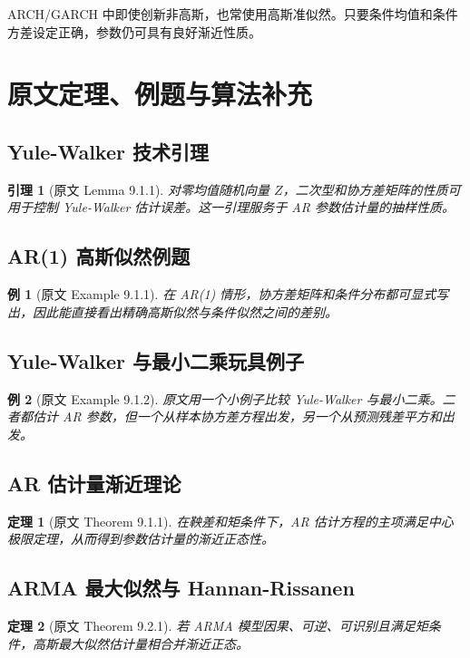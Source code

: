 \documentclass[11pt,a4paper]{ctexart}
\newtheorem{theorem}{定理}[section]
\newtheorem{lemma}{引理}[section]
\newtheorem{example}{例}[section]
\begin{document}
ARCH/GARCH 中即使创新非高斯，也常使用高斯准似然。只要条件均值和条件方差设定正确，参数仍可具有良好渐近性质。

\section{原文定理、例题与算法补充}

\subsection{Yule-Walker 技术引理}
\begin{lemma}[原文 Lemma 9.1.1]
对零均值随机向量 \(Z\)，二次型和协方差矩阵的性质可用于控制 Yule-Walker 估计误差。这一引理服务于 AR 参数估计量的抽样性质。
\end{lemma}

\subsection{AR(1) 高斯似然例题}
\begin{example}[原文 Example 9.1.1]
在 AR(1) 情形，协方差矩阵和条件分布都可显式写出，因此能直接看出精确高斯似然与条件似然之间的差别。
\end{example}

\subsection{Yule-Walker 与最小二乘玩具例子}
\begin{example}[原文 Example 9.1.2]
原文用一个小例子比较 Yule-Walker 与最小二乘。二者都估计 AR 参数，但一个从样本协方差方程出发，另一个从预测残差平方和出发。
\end{example}

\subsection{AR 估计量渐近理论}
\begin{theorem}[原文 Theorem 9.1.1]
在鞅差和矩条件下，AR 估计方程的主项满足中心极限定理，从而得到参数估计量的渐近正态性。
\end{theorem}

\subsection{ARMA 最大似然与 Hannan-Rissanen}
\begin{theorem}[原文 Theorem 9.2.1]
若 ARMA 模型因果、可逆、可识别且满足矩条件，高斯最大似然估计量相合并渐近正态。
\end{theorem}
\end{document}
